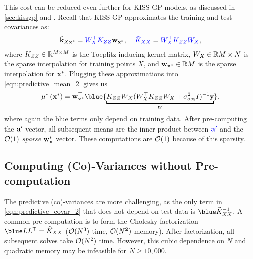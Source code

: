 This cost can be reduced even further for KISS-GP models, as discussed in \cref{sec:kissgp} and \citep{wilson2015thoughts}.
Recall that KISS-GP approximates the training and test covariances as:
%
\begin{align*}
  \tilde{\mathbf{k}}_{X \mathbf{x}^*} = {\color{blue} W^\top_{X} K_{Z Z}} \mathbf{w}_{\mathbf{x}^*},
  \quad
  {\color{blue} \tilde{\ensuremath{K}}_{\ensuremath{X}\ensuremath{X}}} = {\color{blue} W^\top_{X} K_{Z Z} W_{X}},
\end{align*}
%
where $K_{ZZ} \in \mathbb{R}^{M \times M}$ is the Toeplitz inducing kernel matrix, $W_{X} \in \mathbb{R}{M \times N}$ is the sparse interpolation for training points $X$, and $\mathbf{w}_{\mathbf{x}^*} \in \mathbb{R}{M}$ is the sparse interpolation for $\mathbf{x}^*$.
Plugging these approximations into \cref{eqn:predictive_mean_2} gives us
\[
  \meantest{\bxtest} = \bw_{\bxtest}^\top {\blue{\underbracket{\bK_{\bZ\bZ} \bW_{\bX}(\bW_{\bX}^{\top}\bK_{\bZ\bZ}\bW_{\bX} + \sigma_\text{obs}^{2} \bI)^{-1} \by}_{\ba'}}}.
\]
where again the blue terms only depend on training data.
After pre-computing the $\mathbf{a}'$ vector, all subsequent means are the inner product between $\color{blue} \mathbf{a}'$ and the \emph{$\bigo{1}$ sparse} $\bw_\bxtest$ vector.
These computations are $\bigo{1}$ because of this sparsity.

\subsection{Computing (Co)-Variances without Pre-computation}

The predictive (co)-variances are more challenging, as the only term in \cref{eqn:predictive_covar_2} that does not depend on test data is $\blue \trainK^{-1}$.
A common pre-computation is to form the Cholesky factorization $\blue \bL \bL^\top = \trainK$ ($\bigo{N^3}$ time, $\bigo{N^2}$ memory).
After factorization, all subsequent solves take $\bigo{N^2}$ time.
However, this cubic dependence on $N$ and quadratic memory may be infeasible for $N \geq 10,\!000$.

